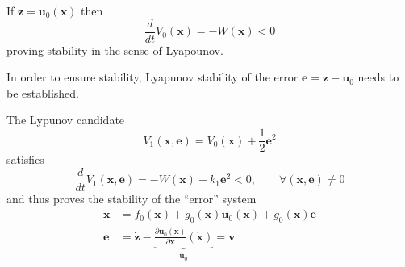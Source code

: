 \newpar{}
If $\mathbf{z} = \mathbf{u}_0(\mathbf{x})$ then 
\noindent\begin{equation*}
    \frac{d}{dt} V_0(\mathbf{x}) = -W(\mathbf{x}) < 0
\end{equation*}
proving stability in the sense of Lyapounov.

\newpar{}

In order to ensure stability, Lyapunov stability of the error $\mathbf{e} = \mathbf{z}-\mathbf{u}_0$ needs to be established.

The Lypunov candidate
\noindent\begin{equation*}
    V_1(\mathbf{x}, \mathbf{e}) = V_0(\mathbf{x})+\frac{1}{2} \mathbf{e}^2
\end{equation*}
satisfies
\noindent\begin{equation*}
    \frac{d}{dt}V_1(\mathbf{x}, \mathbf{e}) = -W(\mathbf{x}) - k_1 \mathbf{e}^2 <0 ,\qquad \forall(\mathbf{x},\mathbf{e}) \neq 0
\end{equation*}
and thus proves the stability of the ``error'' system
\noindent\begin{align*}
    \dot{\mathbf{x}} &= f_0(\mathbf{x})+g_0(\mathbf{x})\mathbf{u}_0(\mathbf{x}) + g_0(\mathbf{x})\mathbf{e}\\
    \dot{\mathbf{e}} &= \dot{\mathbf{z}} - \underbrace{\frac{\partial \mathbf{u}_0(\mathbf{x})}{\partial \mathbf{x}}(\dot{\mathbf{x}})}_{\dot{\mathbf{u}}_0} = \mathbf{v}
\end{align*}